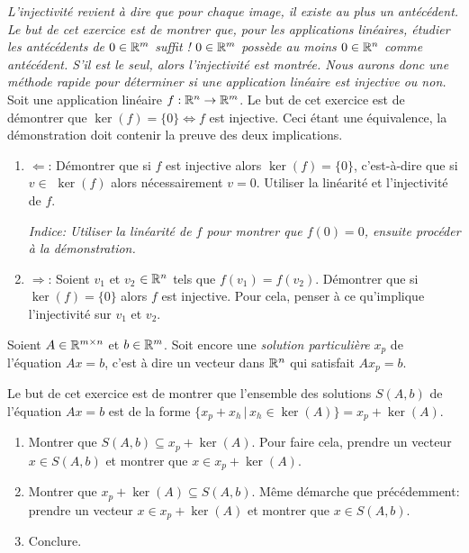 \begin{exercice}
\textit{L'injectivité revient à dire que pour chaque image, il existe au plus un antécédent. Le but de cet exercice est de montrer que, pour les applications linéaires, étudier les antécédents de $0 \in \mathbb{R}^m$ suffit ! $0 \in \mathbb{R}^m$ possède au moins $0 \in \mathbb{R}^n$ comme antécédent. S'il est le seul, alors l'injectivité est montrée. Nous aurons donc une méthode rapide pour déterminer si une application linéaire est injective ou non.} \\

\noindent Soit une application linéaire $f : \mathbb{R}^n \to \mathbb{R}^m$. Le but de cet exercice est de démontrer que $\ker(f) = \{0\} \iff f$ est injective. Ceci étant une équivalence, la démonstration doit contenir la preuve des deux implications. %
\begin{enumerate}
    \item $\Leftarrow$: Démontrer que si $f$ est injective alors $\ker(f) = \{0\}$, c'est-à-dire que si $v \in$ $\ker(f)$ alors nécessairement $v=0$. Utiliser la linéarité et l'injectivité de $f$. 
    
    \textit{Indice: Utiliser la linéarité de $f$ pour montrer que $f(0) = 0$, ensuite procéder à la démonstration.}
    
    \item $\Rightarrow$: Soient $v_1$ et $v_2$ $\in \mathbb{R}^n$ tels que $f(v_1) = f(v_2)$. Démontrer que si $\ker(f) = \{0\}$ alors $f$ est injective. Pour cela, penser à ce qu'implique l'injectivité sur $v_1$ et $v_2$. \\
\end{enumerate}
\end{exercice}

\begin{exercice}
Soient $A \in \mathbb{R}^{m \times n}$ et $b \in \mathbb{R}^m$. Soit encore une \textit{solution particulière} $x_p$ de l'équation $Ax=b$, c'est à dire un vecteur dans $\mathbb{R}^n$ qui satisfait $Ax_p = b$. 

\noindent Le but de cet exercice est de montrer que l'ensemble des solutions $S(A,b)$ de l'équation $Ax=b$ est de la forme $\{x_p + x_h \, | \, x_h \in \ker(A) \} = x_p + \ker(A)$.

\begin{enumerate}
    \item Montrer que $S(A,b) \subseteq x_p + \ker(A)$. Pour faire cela, prendre un vecteur $x \in S(A,b)$ et montrer que $x \in x_p + \ker(A)$.
    \item Montrer que $x_p + \ker(A) \subseteq S(A,b)$. Même démarche que précédemment: prendre un vecteur $x \in x_p + \ker(A)$ et montrer que $x \in S(A,b)$.
    \item Conclure. \\
\end{enumerate}
\end{exercice}


